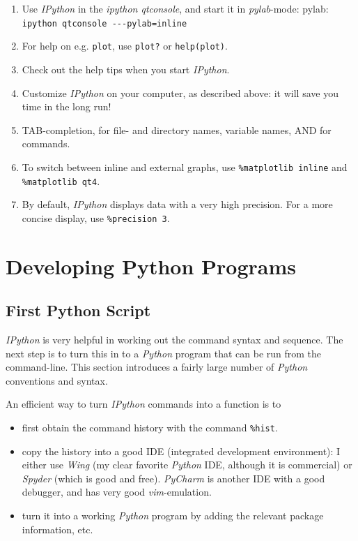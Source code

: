 \begin{enumerate}
    \item Use \emph{IPython} in the \emph{ipython qtconsole}, and start it in \emph{pylab}-mode: pylab: \lstinline{ipython qtconsole ---pylab=inline}
    \item For help on e.g. \lstinline{plot}, use \lstinline{plot?} or \lstinline{help(plot)}.
    \item Check out the help tips when you start \emph{IPython}.
    \item Customize \emph{IPython} on your computer, as described above: it will save you time in the long run!
    \item TAB-completion, for file- and directory names, variable names, AND for commands.
    \item To switch between inline and external graphs, use \; \lstinline{%matplotlib inline} \; and \; \lstinline{%matplotlib qt4}.
    \item By default, \emph{IPython} displays data with a very high precision. For a more concise display, use \lstinline{%precision 3}.
\end{enumerate}

\section{Developing Python Programs}

\subsection{First Python Script}

\emph{IPython} is very helpful in working out the command syntax and sequence. The next step is to turn this in to a \emph{Python} program that can be run from the command-line. This section introduces a fairly large number of \emph{Python} conventions and syntax.

An efficient way to turn \emph{IPython} commands into a function is to

\begin{itemize}
  \item first obtain the command history with the command \lstinline{%hist}.
  \item copy the history into a good IDE (integrated development environment): I either use \emph{Wing} (my clear favorite \emph{Python} IDE, although it is commercial) or \emph{Spyder} (which is good and free). \emph{PyCharm} is another IDE with a good debugger, and has very good \emph{vim}-emulation.
  \item turn it into a working \emph{Python} program by adding the relevant package information, etc.
\end{itemize}

